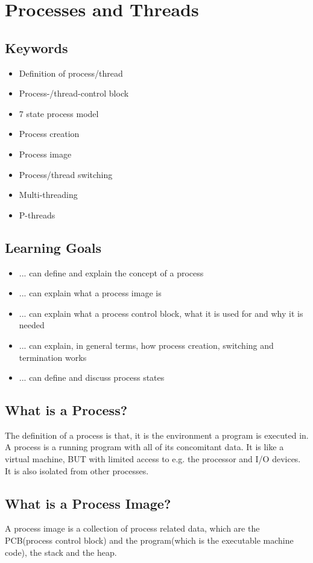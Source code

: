 \documentclass{report}
\begin{document}
\chapter{Processes and Threads}
\section{Keywords}
\begin{itemize}
\item Definition of process/thread
\item Process-/thread-control block
\item 7 state process model
\item Process creation
\item Process image
\item Process/thread switching
\item Multi-threading
\item P-threads
\end{itemize}
\newpage
\section{Learning Goals}
\begin{itemize}
\item ... can define and explain the concept of a process
\item ... can explain what a process image is
\item ... can explain what a process control block, what it is used for and why it is needed
\item ... can explain, in general terms, how process creation, switching and termination works
\item ... can define and discuss process states
\end{itemize}
\section{What is a Process?}
The definition of a process is that, it is the environment a program is executed in. A process is a running program with all of its concomitant data. It is like a virtual machine, BUT with limited access to e.g. the processor and I/O devices. It is also isolated from other processes.

\section{What is a Process Image?}
A process image is a collection of process related data, which are the PCB(process control block) and the program(which is the executable machine code), the stack and the heap.
\end{document}
